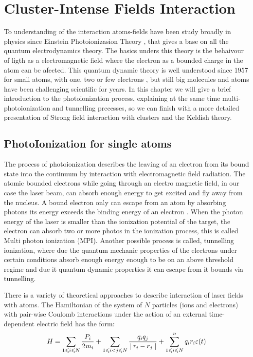 \section{Cluster-Intense Fields  Interaction}

To understanding of the interaction atoms-fields have been study broadly in physics since Einstein Photoionizasion Theory \cite{einstein_uber_1905}, that gives a base on all the quantum electrodynamics theory. The basics unders this theory is the behaivour of ligth as a electromagnetic field where the electron as a bounded charge in the atom can be afected.  This quantum dynamic theory is well understood since 1957 for small atoms, with one, two or few electrons \cite{a._bethe_quantum_1957}, but still big molecules and atoms have been challenging scientific for years. In this chapter we will give a brief introduction to the photoionization process, explaining at the same time multi-photoionization and tunnelling precesses, so we can finish with a more detailed presentation of Strong field interaction with clusters and the Keldish theory.


\subsection{PhotoIonization for single atoms}

The process of photoionization describes the leaving of an electron from its bound state  into the continuum by interaction with electromagnetic field radiation\cite{berkowitz_photoabsorption_1979}. The atomic bounded electrons while going through an electro magnetic field, in our case the laser beam,  can absorb enough  energy to get excited and fly away from the nucleus. A bound electron only can escape from an atom by absorbing photons its energy exceeds the binding energy of an electron \cite{einstein_uber_1905}. When the photon energy of the laser is smaller than the ionization potential of the target, the electron can absorb two or more photos in the ionization process, this is called Multi photon ionization (MPI). Another possible process is called, tunnelling ionization, where due the quantum mechanic properties of the electrons under certain conditions absorb enough energy enough to be on an above threshold regime and due it quantum dynamic properties it can escape from it bounds via tunnelling.

There is a variety of theoretical approaches to describe interaction of  laser fields with atoms. The Hamiltonian of the system of $N$ particles (ions and electrons) with pair-wise Coulomb interactions under the action of an external time-dependent electric field has the form:
\begin{equation}  \label{eq:hamiltonian}
\centering
H = \displaystyle\sum_{1 \leqslant i \leqslant N}^{} \dfrac{P_{i}}{2m_{i}} + \displaystyle\sum_{1 \leqslant i < j \leqslant N}^{} \dfrac{q_{i}q_{j}}{\mid r_{i}-r_{j} \mid} + \displaystyle\sum_{1 \leqslant i \leqslant N}^{n} q_{i}r_{i}\varepsilon(t)
\end{equation}


